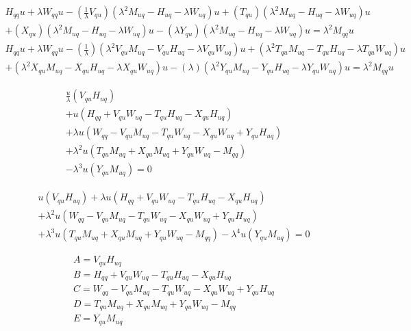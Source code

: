 \documentclass[a4paper,12p]{article}
\begin{document}
	
	\begin{equation}
	\begin{split}
	H_{qq}u 
	+ \lambda W_{qq}u 
	- (\frac{1}{\lambda}V_{qu})
	(\lambda^2 M_{uq} - H_{uq}  - \lambda W_{uq})u
	+ (T_{qu})
	(\lambda^2 M_{uq} - H_{uq}  - \lambda W_{uq})u \\
	+ (X_{qu})
	(\lambda^2 M_{uq} - H_{uq}  - \lambda W_{uq})u
	- (\lambda Y_{qu})
	(\lambda^2 M_{uq} - H_{uq}  - \lambda W_{uq})u 
	= \lambda^2 M_{qq}u
	\end{split}
	\end{equation}
	\begin{equation}
	\begin{split}
	H_{qq}u 
	+ \lambda W_{qq}u 
	- (\frac{1}{\lambda})
	(\lambda^2 V_{qu}M_{uq} - V_{qu}H_{uq}  - \lambda V_{qu}W_{uq})u
	+ (\lambda^2 T_{qu}M_{uq} - T_{qu}H_{uq}  - \lambda T_{qu}W_{uq})u \\
	+ (\lambda^2 X_{qu}M_{uq} - X_{qu}H_{uq}  - \lambda X_{qu}W_{uq})u
	- (\lambda )
	(\lambda^2 Y_{qu}M_{uq} - Y_{qu}H_{uq}  - \lambda Y_{qu}W_{uq})u 
	= \lambda^2 M_{qq}u
	\end{split}
	\end{equation}
	
	\begin{gather}
	\frac{u}{\lambda} (V_{qu}H_{uq})  \\
	+ u(H_{qq} + V_{qu}W_{uq} - T_{qu}H_{uq} - X_{qu}H_{uq}) \\
	+ \lambda u (W_{qq} - V_{qu}M_{uq} - T_{qu}W_{uq} - X_{qu}W_{uq} +  Y_{qu}H_{uq})\\
	+ \lambda^2 u (T_{qu}M_{uq} + X_{qu}M_{uq} + Y_{qu}W_{uq} - M_{qq})\\
	- \lambda^3 u (Y_{qu}M_{uq})
	= 0
	\end{gather}
	
	\begin{equation}
	\begin{split}
	u(V_{qu}H_{uq})
	+ \lambda u (H_{qq} + V_{qu}W_{uq} - T_{qu}H_{uq} - X_{qu}H_{uq}) \\
	+ \lambda^2 u (W_{qq} - V_{qu}M_{uq} - T_{qu}W_{uq} - X_{qu}W_{uq} +  Y_{qu}H_{uq}) \\
	+ \lambda^3 u (T_{qu}M_{uq} + X_{qu}M_{uq} + Y_{qu}W_{uq} - M_{qq})
	- \lambda^4 u (Y_{qu}M_{uq})
	= 0
	\end{split}
	\end{equation}
	
	\begin{gather}
	A = V_{qu}H_{uq}  \\
	B = H_{qq} + V_{qu}W_{uq} - T_{qu}H_{uq} - X_{qu}H_{uq} \\
	C = W_{qq} - V_{qu}M_{uq} - T_{qu}W_{uq} - X_{qu}W_{uq} +  Y_{qu}H_{uq}\\
	D = T_{qu}M_{uq} + X_{qu}M_{uq} + Y_{qu}W_{uq} - M_{qq}\\
	E = Y_{qu}M_{uq}
	\end{gather}
	
\end{document}
